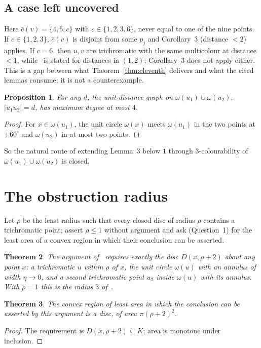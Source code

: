 \documentclass[11pt,a4paper]{amsart}
\newtheorem{theorem}{Theorem}[section]
\newtheorem{proposition}[theorem]{Proposition}
\theoremstyle{remark}
\begin{document}
\subsection{A case left uncovered}
Here $\bar c(v)=\{4,5,c\}$ with $c\in\{1,2,3,6\}$, never equal to one of the nine points. If $c\in\{1,2,3\}$, $\bar c(v)$ is disjoint from some $p_j$ and Corollary~3 (distance $<2$) applies. If $c=6$, then $u,v$ are trichromatic with the same multicolour at distance $<1$, while~\cite[Lemma 3]{SV26} is stated for distances in $(1,2)$; Corollary~3 does not apply either. This is a gap between what Theorem~\ref{thm:eleventh} delivers and what the cited lemmas consume; it is not a counterexample.

\begin{proposition}\label{prop:degree4}
For any $d$, the unit-distance graph on $\omega(u_1)\cup\omega(u_2)$, $|u_1u_2|=d$, has maximum degree at most $4$.
\end{proposition}
\begin{proof}
For $x\in\omega(u_1)$, the unit circle $\omega(x)$ meets $\omega(u_1)$ in the two points at $\pm60^\circ$ and $\omega(u_2)$ in at most two points.
\end{proof}
So the natural route of extending Lemma~3 below $1$ through $3$-colourability of $\omega(u_1)\cup\omega(u_2)$ is closed.

\section{The obstruction radius}\label{sec:radius}

Let $\rho$ be the least radius such that every closed disc of radius $\rho$ contains a trichromatic point; \cite[\S7]{SV26} assert $\rho\le1$ without argument and ask (Question~1) for the least area of a convex region in which their conclusion can be asserted.

\begin{theorem}\label{thm:radius}
The argument of~\cite{SV26} requires exactly the disc $D(x,\rho+2)$ about any point $x$: a trichromatic $u$ within $\rho$ of $x$, the unit circle $\omega(u)$ with an annulus of width $\eta\to0$, and a second trichromatic point $u_2$ inside $\omega(u)$ with its annulus. With $\rho=1$ this is the radius $3$ of~\cite{SV26}.
\end{theorem}

\begin{theorem}\label{thm:disc}
The convex region of least area in which the conclusion can be asserted by this argument is a disc, of area $\pi(\rho+2)^2$.
\end{theorem}
\begin{proof}
The requirement is $D(x,\rho+2)\subseteq K$; area is monotone under inclusion.
\end{proof}
\end{document}

